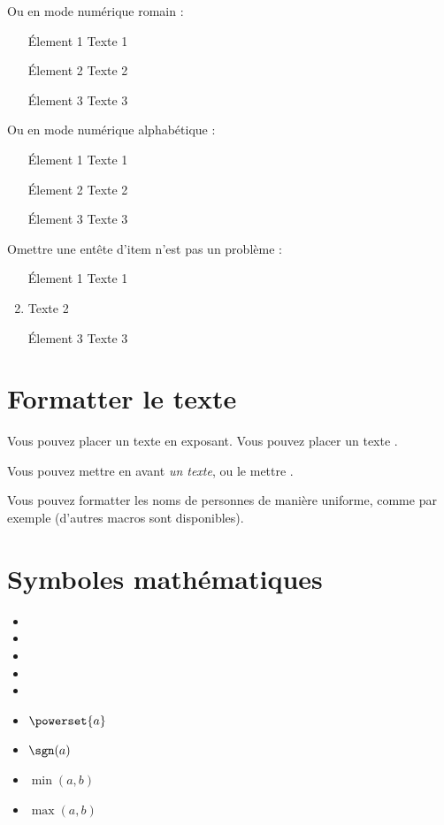 \documentclass[french]{spimutbmphdthesis}
\begin{document}
Ou en mode numérique romain :
\begin{enumerate}[i]
\item[\'Element 1] Texte 1
\item[\'Element 2] Texte 2
\item[\'Element 3] Texte 3
\end{enumerate}

Ou en mode numérique alphabétique :
\begin{enumerate}[a]
\item[\'Element 1] Texte 1
\item[\'Element 2] Texte 2
\item[\'Element 3] Texte 3
\end{enumerate}

Omettre une entête d'item n'est pas un problème :
\begin{enumerate}
\item[\'Element 1] Texte 1
\item Texte 2
\item[\'Element 3] Texte 3
\end{enumerate}

\section{Formatter le texte}

Vous pouvez placer un texte \textup{en exposant}. Vous pouvez placer un texte .

Vous pouvez mettre en avant \emph{un texte}, ou le mettre .

Vous pouvez formatter les noms de personnes de manière uniforme, comme par exemple  (d'autres macros sont disponibles).

\section{Symboles mathématiques}

\begin{itemize}
\item \R
\item \N
\item \Z
\item \Q
\item \C
\item $\powerset{a}$
\item $\sgn(a)$
\item $\min(a, b)$
\item $\max(a, b)$
\end{itemize}
\end{document}
